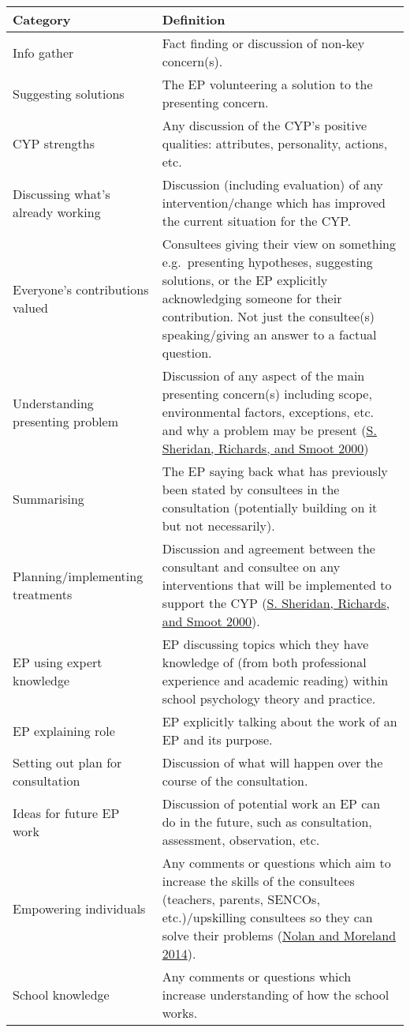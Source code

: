 \documentclass[
]{article}
\begin{document}
\begin{longtable}[]{@{}
  >{\raggedright\arraybackslash}p{}
  >{\raggedright\arraybackslash}p{}@{}}
\toprule
Category & Definition \\
\midrule
\endhead
Info gather & Fact finding or discussion of non-key concern(s). \\
Suggesting solutions & The EP volunteering a solution to the presenting
concern. \\
CYP strengths & Any discussion of the CYP's positive qualities:
attributes, personality, actions, etc. \\
Discussing what's already working & Discussion (including evaluation) of
any intervention/change which has improved the current situation for the
CYP. \\
Everyone's contributions valued & Consultees giving their view on
something e.g.~presenting hypotheses, suggesting solutions, or the EP
explicitly acknowledging someone for their contribution. Not just the
consultee(s) speaking/giving an answer to a factual question. \\
Understanding presenting problem & Discussion of any aspect of the main
presenting concern(s) including scope, environmental factors,
exceptions, etc. and why a problem may be present
(\protect\hyperlink{ref-sheridanSchoolConsultation2000}{S. Sheridan,
Richards, and Smoot 2000}) \\
Summarising & The EP saying back what has previously been stated by
consultees in the consultation (potentially building on it but not
necessarily). \\
Planning/implementing treatments & Discussion and agreement between the
consultant and consultee on any interventions that will be implemented
to support the CYP
(\protect\hyperlink{ref-sheridanSchoolConsultation2000}{S. Sheridan,
Richards, and Smoot 2000}). \\
EP using expert knowledge & EP discussing topics which they have
knowledge of (from both professional experience and academic reading)
within school psychology theory and practice. \\
EP explaining role & EP explicitly talking about the work of an EP and
its purpose. \\
Setting out plan for consultation & Discussion of what will happen over
the course of the consultation. \\
Ideas for future EP work & Discussion of potential work an EP can do in
the future, such as consultation, assessment, observation, etc. \\
Empowering individuals & Any comments or questions which aim to increase
the skills of the consultees (teachers, parents, SENCOs,
etc.)/upskilling consultees so they can solve their problems
(\protect\hyperlink{ref-nolanProcessPsychologicalConsultation2014}{Nolan
and Moreland 2014}). \\
School knowledge & Any comments or questions which increase
understanding of how the school works. \\
\bottomrule
\end{longtable}
\end{document}
